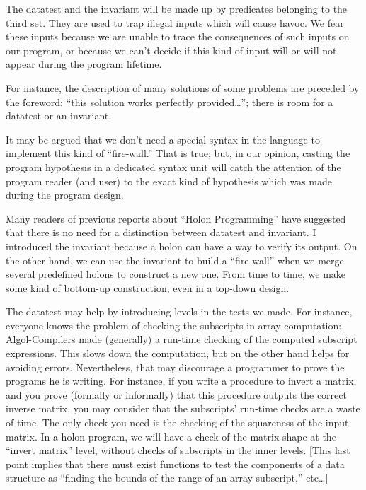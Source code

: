 \documentclass[openany,nobib]{tufte-book}
\begin{document}
The datatest and the invariant will be made up by predicates belonging to the
third set. They are used to trap illegal inputs which will cause havoc. We fear
these inputs because we are unable to trace the consequences of such inputs on
our program, or because we can't decide if this kind of input will or will not
appear during the program lifetime.

For instance, the description of many solutions of some problems are preceded
by the foreword: ``this solution works perfectly provided\dots''; there is room
for a datatest or an invariant.

It may be argued that we don't need a special syntax in the language to
implement this kind of ``fire-wall.'' That is true; but, in our opinion,
casting the program hypothesis in a dedicated syntax unit will catch the
attention of the program reader (and user) to the exact kind of hypothesis
which was made during the program design.

Many readers of previous reports about ``Holon
Programming''\autocite{marneffe1972} have suggested that there is no need for a
distinction between datatest and invariant. I introduced the invariant because
a holon can have a way to verify its output. On the other hand, we can use the
invariant to build a ``fire-wall'' when we merge several predefined holons to
construct a new one. From time to time, we make some kind of bottom-up
construction, even in a top-down design.

The datatest may help by introducing levels in the tests we made. For instance,
everyone knows the problem of checking the subscripts in array computation:
Algol-Compilers made (generally) a run-time checking of the computed subscript
expressions. This slows down the computation, but on the other hand helps for
avoiding errors. Nevertheless, that may discourage a programmer to prove the
programs he is writing. For instance, if you write a procedure to invert a
matrix, and you prove (formally or informally) that this procedure outputs the
correct inverse matrix, you may consider that the subscripts' run-time checks
are a waste of time. The only check you need is the checking of the squareness
of the input matrix. In a holon program, we will have a check of the matrix
shape at the ``invert matrix'' level, without checks of subscripts in the inner
levels. [This last point implies that there must exist functions to test the
components of a data structure as ``finding the bounds of the range of an array
subscript,'' etc\dots]

\bigskip
\end{document}
